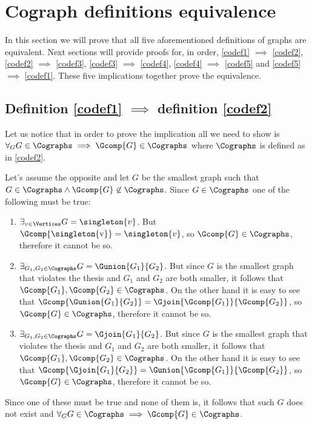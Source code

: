 
\section{Cograph definitions equivalence}\label{r:codefeq}

In this section we will prove that all five aforementioned definitions of graphs are equivalent. Next sections will provide proofs for, in order, \ref{codef1} $\implies$ \ref{codef2}, \ref{codef2} $\implies$ \ref{codef3}, \ref{codef3} $\implies$ \ref{codef4}, \ref{codef4} $\implies$ \ref{codef5} and \ref{codef5} $\implies$ \ref{codef1}. These five implications together prove the equivalence.

\subsection{Definition \ref{codef1} $\implies$ definition \ref{codef2}}

Let us notice that in order to prove the implication all we need to show is $\forall_G G \in \Cographs \implies \Gcomp{G} \in \Cographs$ where $\Cographs$ is defined as in \ref{codef2}.

Let's assume the opposite and let $G$ be the smallest graph such that $G \in \Cographs \land \Gcomp{G} \not\in \Cographs$. Since $G \in \Cographs$ one of the following must be true:
\begin{enumerate}
    \item $\exists_{v\in \Vertices} G = \singleton{v}$. But $\Gcomp{\mbox{\singleton{v}}\raisebox{3mm}{}} = \singleton{v}$, so $\Gcomp{G} \in \Cographs$, therefore it cannot be so.
    \item $\exists_{G_1, G_2 \in \Cographs} G = \Gunion{G_1}{G_2}$. But since $G$ is the smallest graph that violates the thesis and $G_1$ and $G_2$ are both smaller, it follows that $\Gcomp{G_1}, \Gcomp{G_2} \in \Cographs$. On the other hand it is easy to see that $\Gcomp{\Gunion{G_1}{G_2}} = \Gjoin{\Gcomp{G_1}}{\Gcomp{G_2}}$, so $\Gcomp{G} \in \Cographs$, therefore it cannot be so.
    \item $\exists_{G_1, G_2 \in \Cographs} G = \Gjoin{G_1}{G_2}$. But since $G$ is the smallest graph that violates the thesis and $G_1$ and $G_2$ are both smaller, it follows that $\Gcomp{G_1}, \Gcomp{G_2} \in \Cographs$. On the other hand it is easy to see that $\Gcomp{\Gjoin{G_1}{G_2}} = \Gunion{\Gcomp{G_1}}{\Gcomp{G_2}}$, so $\Gcomp{G} \in \Cographs$, therefore it cannot be so.
\end{enumerate}
Since one of these must be true and none of them is, it follows that such $G$ does not exist and $\forall_G G \in \Cographs \implies \Gcomp{G} \in \Cographs$.

